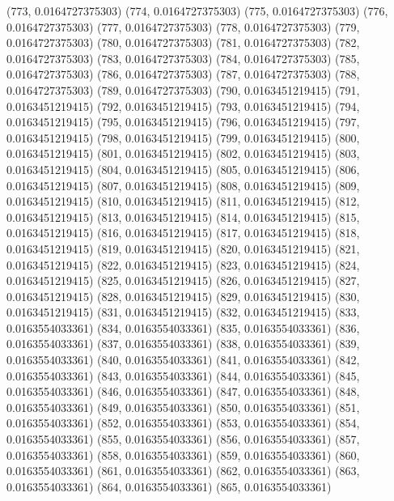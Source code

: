 {					(773, 0.0164727375303)
					(774, 0.0164727375303)
					(775, 0.0164727375303)
					(776, 0.0164727375303)
					(777, 0.0164727375303)
					(778, 0.0164727375303)
					(779, 0.0164727375303)
					(780, 0.0164727375303)
					(781, 0.0164727375303)
					(782, 0.0164727375303)
					(783, 0.0164727375303)
					(784, 0.0164727375303)
					(785, 0.0164727375303)
					(786, 0.0164727375303)
					(787, 0.0164727375303)
					(788, 0.0164727375303)
					(789, 0.0164727375303)
					(790, 0.0163451219415)
					(791, 0.0163451219415)
					(792, 0.0163451219415)
					(793, 0.0163451219415)
					(794, 0.0163451219415)
					(795, 0.0163451219415)
					(796, 0.0163451219415)
					(797, 0.0163451219415)
					(798, 0.0163451219415)
					(799, 0.0163451219415)
					(800, 0.0163451219415)
					(801, 0.0163451219415)
					(802, 0.0163451219415)
					(803, 0.0163451219415)
					(804, 0.0163451219415)
					(805, 0.0163451219415)
					(806, 0.0163451219415)
					(807, 0.0163451219415)
					(808, 0.0163451219415)
					(809, 0.0163451219415)
					(810, 0.0163451219415)
					(811, 0.0163451219415)
					(812, 0.0163451219415)
					(813, 0.0163451219415)
					(814, 0.0163451219415)
					(815, 0.0163451219415)
					(816, 0.0163451219415)
					(817, 0.0163451219415)
					(818, 0.0163451219415)
					(819, 0.0163451219415)
					(820, 0.0163451219415)
					(821, 0.0163451219415)
					(822, 0.0163451219415)
					(823, 0.0163451219415)
					(824, 0.0163451219415)
					(825, 0.0163451219415)
					(826, 0.0163451219415)
					(827, 0.0163451219415)
					(828, 0.0163451219415)
					(829, 0.0163451219415)
					(830, 0.0163451219415)
					(831, 0.0163451219415)
					(832, 0.0163451219415)
					(833, 0.0163554033361)
					(834, 0.0163554033361)
					(835, 0.0163554033361)
					(836, 0.0163554033361)
					(837, 0.0163554033361)
					(838, 0.0163554033361)
					(839, 0.0163554033361)
					(840, 0.0163554033361)
					(841, 0.0163554033361)
					(842, 0.0163554033361)
					(843, 0.0163554033361)
					(844, 0.0163554033361)
					(845, 0.0163554033361)
					(846, 0.0163554033361)
					(847, 0.0163554033361)
					(848, 0.0163554033361)
					(849, 0.0163554033361)
					(850, 0.0163554033361)
					(851, 0.0163554033361)
					(852, 0.0163554033361)
					(853, 0.0163554033361)
					(854, 0.0163554033361)
					(855, 0.0163554033361)
					(856, 0.0163554033361)
					(857, 0.0163554033361)
					(858, 0.0163554033361)
					(859, 0.0163554033361)
					(860, 0.0163554033361)
					(861, 0.0163554033361)
					(862, 0.0163554033361)
					(863, 0.0163554033361)
					(864, 0.0163554033361)
					(865, 0.0163554033361)
}
